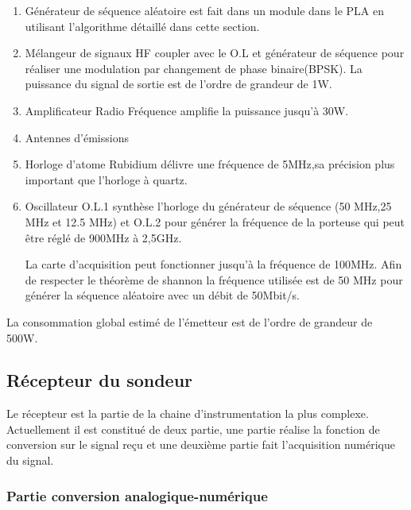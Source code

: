 \begin{enumerate}
\item Générateur de séquence aléatoire est fait dans un module dans le PLA en utilisant l'algorithme détaillé dans cette section.\pageref{gene code pseudo}
\item Mélangeur de signaux HF coupler avec le O.L et générateur de séquence pour réaliser une modulation par changement de phase binaire(BPSK). La puissance du signal de sortie est de l'ordre de grandeur de 1W.
\item Amplificateur Radio Fréquence amplifie la puissance jusqu'à 30W.
\item Antennes d'émissions
\item Horloge d'atome Rubidium délivre une fréquence de 5MHz,sa précision plus important que l'horloge à quartz.
\item Oscillateur O.L.1 synthèse l'horloge du générateur de séquence (50 MHz,25 MHz et 12.5 MHz) et O.L.2 pour générer la fréquence de la porteuse qui peut être réglé de 900MHz à 2,5GHz.

La carte d'acquisition peut fonctionner jusqu'à la fréquence de 100MHz. Afin de respecter le théorème de shannon la fréquence utilisée est de 50 MHz pour générer la séquence aléatoire avec un débit de 50Mbit/s. 
\end{enumerate}
La consommation global estimé de l'émetteur est de l'ordre de grandeur de 500W.
\subsection{Récepteur du sondeur}

Le récepteur est la partie de la chaine d'instrumentation la plus complexe. Actuellement il est constitué de deux partie, une partie réalise la fonction de conversion sur le signal reçu et une deuxième partie fait l'acquisition numérique du signal.

\subsubsection{Partie conversion analogique-numérique}

